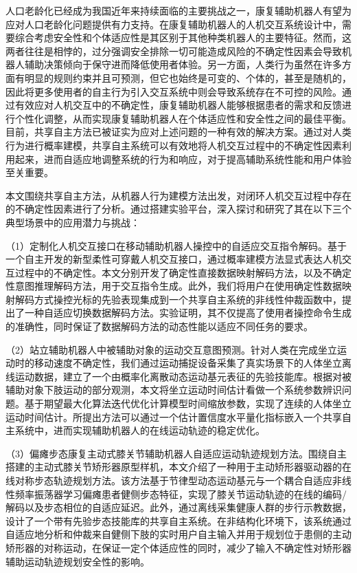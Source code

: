 人口老龄化已经成为我国近年来持续面临的主要挑战之一，康复辅助机器人有望为应对人口老龄化问题提供有力支持。在康复辅助机器人的人机交互系统设计中，需要综合考虑安全性和个体适应性是其区别于其他种类机器人的主要特征。然而，这两者往往是相悖的，过分强调安全排除一切可能造成风险的不确定性因素会导致机器人辅助决策倾向于保守进而降低使用者体验。另一方面，人类行为虽然在许多方面有明显的规则约束并且可预测，但它也始终是可变的、个体的，甚至是随机的，因此将更多使用者的自主行为引入交互系统中则会导致系统存在不可控的风险。通过有效应对人机交互中的不确定性，康复辅助机器人能够根据患者的需求和反馈进行个性化调整，从而实现康复辅助机器人在个体适应性和安全性之间的最佳平衡。目前，共享自主方法已被证实为应对上述问题的一种有效的解决方案。通过对人类行为进行概率建模，共享自主系统可以有效地将人机交互过程中的不确定性因素利用起来，进而自适应地调整系统的行为和响应，对于提高辅助系统性能和用户体验至关重要。

本文围绕共享自主方法，从机器人行为建模方法出发，对闭环人机交互过程中存在的不确定性因素进行了分析。通过搭建实验平台，深入探讨和研究了其在以下三个典型场景中的应用潜力与挑战：

（1）定制化人机交互接口在移动辅助机器人操控中的自适应交互指令解码。基于一个自主开发的新型柔性可穿戴人机交互接口，通过概率建模方法显式表达人机交互过程中的不确定性。本文分别开发了确定性直接数据映射解码方法，以及不确定性意图推理解码方法，用于交互指令生成。此外，我们将用户在使用确定性数据映射解码方式操控光标的先验表现集成到一个共享自主系统的非线性仲裁函数中，提出了一种自适应切换数据解码方法。实验证明，其不仅提高了使用者操控命令生成的准确性，同时保证了数据解码方法的动态性能以适应不同任务的要求。

（2）站立辅助机器人中被辅助对象的运动交互意图预测。针对人类在完成坐立运动时的移动速度不确定性，我们通过运动捕捉设备采集了真实场景下的人体坐立离线运动数据，建立了一个由概率化离散动态运动基元表征的先验技能库。根据对被辅助对象下肢运动的部分观测，本文将坐立运动时间估计看做一个系统参数辨识问题。基于期望最大化算法迭代优化计算模型时间缩放参数，实现了连续的人体坐立运动时间估计。所提出方法可以通过一个估计置信度水平量化指标嵌入一个共享自主系统中，进而实现辅助机器人的在线运动轨迹的稳定优化。

（3）偏瘫步态康复主动式膝关节辅助机器人自适应运动轨迹规划方法。围绕自主搭建的主动式膝关节矫形器原型样机，本文介绍了一种用于主动矫形器驱动器的在线对称步态轨迹规划方法。该方法基于节律型动态运动基元与一个耦合自适应非线性频率振荡器学习偏瘫患者健侧步态特征，实现了膝关节运动轨迹的在线的编码/解码以及步态相位的自适应延迟。此外，通过离线采集健康人群的步行示教数据，设计了一个带有先验步态技能库的共享自主系统。在非结构化环境下，该系统通过自适应地分析和仲裁来自健侧下肢的实时用户自主输入并用于规划位于患侧的主动矫形器的对称运动，在保证一定个体适应性的同时，减少了输入不确定性对矫形器辅助运动轨迹规划安全性的影响。